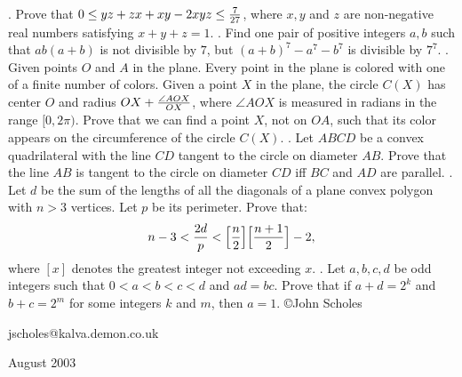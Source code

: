 \nopagenumbers
{}
\vskip 25pt
. Prove that $0\le yz+zx+xy-2xyz\le{7\over27}$, where $x,y$ and $z$ are non-negative real numbers satisfying $x+y+z=1$.
\vskip 12pt
. Find one pair of positive integers $a,b$ such that $ab(a+b)$ is not divisible by $7$, but $(a+b)^7-a^7-b^7$ is divisible by $7^7$.
\vskip 12pt
. Given points $O$ and $A$ in the plane. Every point in the plane is colored with one of a finite number of colors. Given a point $X$ in the plane, the circle $C(X)$ has center $O$ and radius $OX+{\angle AOX\over OX}$, where $\angle AOX$ is measured in radians in the range $[0,2\pi)$. Prove that we can find a point $X$, not on $OA$, such that its color appears on the circumference of the circle $C(X)$.
\vskip 12pt
. Let $ABCD$ be a convex quadrilateral with the line $CD$ tangent to the circle on diameter $AB$. Prove that the line $AB$ is tangent to the circle on diameter $CD$ iff $BC$ and $AD$ are parallel.
\vskip 12pt
. Let $d$ be the sum of the lengths of all the diagonals of a plane convex polygon with $n>3$ vertices. Let $p$ be its perimeter. Prove that: $$n-3<{2d\over p}<\Bigl[{n\over2}\Bigr]\Bigl[{n+1\over 2}\Bigr]-2,$$ where $[x]$ denotes the greatest integer not exceeding $x$.
\vskip 12pt
. Let $a,b,c,d$ be odd integers such that $0<a<b<c<d$ and $ad=bc$. Prove that if $a+d=2^k$ and $b+c=2^m$ for some integers $k$ and $m$, then $a=1$.
\vskip 20pt
\noindent \copyright John Scholes

\noindent jscholes@kalva.demon.co.uk

 August 2003

\bye
